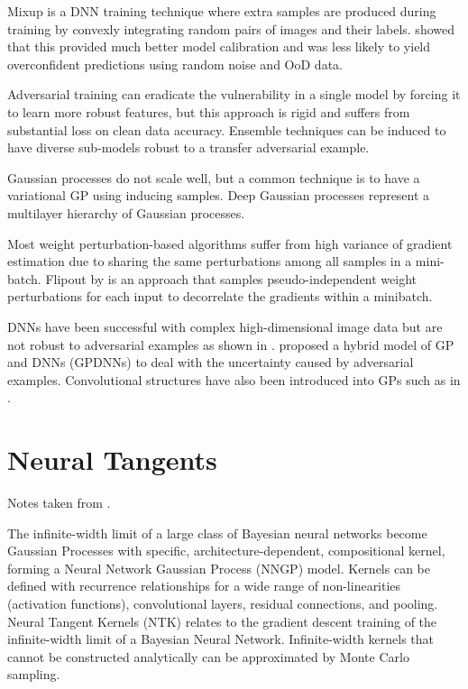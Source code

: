 \documentclass[twoside,11pt]{article}
\begin{document}
Mixup is a DNN training technique where extra samples are produced during training by convexly integrating random pairs of images and their labels.
\cite{thulasidasan2019mixup} showed that this provided much better model calibration and was less likely to yield overconfident predictions using random noise and OoD data.

Adversarial training can eradicate the vulnerability in a single model by forcing it to learn more robust features, but this approach is rigid and suffers from substantial loss on clean data accuracy.
Ensemble techniques can be induced to have diverse sub-models robust to a transfer adversarial example.

Gaussian processes do not scale well, but a common technique is to have a variational GP using inducing samples.
Deep Gaussian processes represent a multilayer hierarchy of Gaussian processes.

Most weight perturbation-based algorithms suffer from high variance of gradient estimation due to sharing the same perturbations among all samples in a mini-batch.
Flipout by \cite{wen2018flipout} is an approach that samples pseudo-independent weight perturbations for each input to decorrelate the gradients within a minibatch.

DNNs have been successful with complex high-dimensional image data but are not robust to adversarial examples as shown in \cite{szegedy2013intriguing}.
\cite{bradshaw2017adversarial} proposed a hybrid model of GP and DNNs (GPDNNs) to deal with the uncertainty caused by adversarial examples.
Convolutional structures have also been introduced into GPs such as in \cite{van2017convolutional}.


\section{Neural Tangents}\label{sec:neural-tangents}
Notes taken from \cite{novak2019neural}.

The infinite-width limit of a large class of Bayesian neural networks become Gaussian Processes with specific, architecture-dependent, compositional kernel, forming a Neural Network Gaussian Process (NNGP) model.
Kernels can be defined with recurrence relationships for a wide range of non-linearities (activation functions), convolutional layers, residual connections, and pooling.
Neural Tangent Kernels (NTK) relates to the gradient descent training of the infinite-width limit of a Bayesian Neural Network.
Infinite-width kernels that cannot be constructed analytically can be approximated by Monte Carlo sampling.
\end{document}
